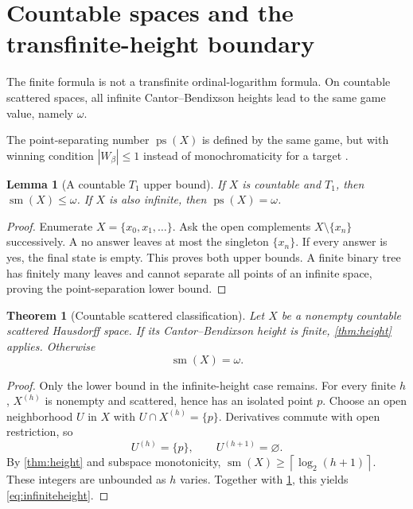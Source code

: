 \documentclass[11pt,letterpaper]{article}
\numberwithin{equation}{section}
\newtheorem{theorem}{Theorem}[section]
\newtheorem{lemma}[lemma]{Lemma}
\theoremstyle{definition}
\theoremstyle{remark}
\newcommand{\sm}{\operatorname{sm}}
\newcommand{\ps}{\operatorname{ps}}
\newcommand{\ceil}[1]{\left\lceil#1\right\rceil}
\begin{document}
\section{Countable spaces and the transfinite-height boundary}
\label{sec:countable}

The finite formula is not a transfinite ordinal-logarithm formula. On countable
scattered spaces, all infinite Cantor--Bendixson heights lead to the same game
value, namely $\omega$.

The point-separating number $\ps(X)$ is defined by the same game, but with
winning condition $|W_\beta|\leq1$ instead of monochromaticity for a target
\cite{CCS}.

\begin{lemma}[A countable $T_1$ upper bound]\label{lem:countable}
If $X$ is countable and $T_1$, then $\sm(X)\leq\omega$. If $X$ is also infinite,
then $\ps(X)=\omega$.
\end{lemma}
\begin{proof}
Enumerate $X=\{x_0,x_1,\ldots\}$. Ask the open complements
$X\setminus\{x_n\}$ successively. A no answer leaves at most the singleton
$\{x_n\}$. If every answer is yes, the final state is empty. This proves both
upper bounds. A finite binary tree has finitely many leaves and cannot separate
all points of an infinite space, proving the point-separation lower bound.
\end{proof}

\begin{theorem}[Countable scattered classification]\label{thm:countable}
Let $X$ be a nonempty countable scattered Hausdorff space. If its
Cantor--Bendixson height is finite, \cref{thm:height} applies. Otherwise
\begin{equation}\label{eq:infiniteheight}
 \sm(X)=\omega.
\end{equation}
\end{theorem}
\begin{proof}
Only the lower bound in the infinite-height case remains. For every finite $h$,
$X^{(h)}$ is nonempty and scattered, hence has an isolated point $p$.
Choose an open neighborhood $U$ in $X$ with $U\cap X^{(h)}=\{p\}$.
Derivatives commute with open restriction, so
\[
 U^{(h)}=\{p\},\qquad U^{(h+1)}=\varnothing.
\]
By \cref{thm:height} and subspace monotonicity,
$\sm(X)\geq\ceil{\log_2(h+1)}$. These integers are unbounded as $h$ varies.
Together with \cref{lem:countable}, this yields \eqref{eq:infiniteheight}.
\end{proof}
\end{document}
